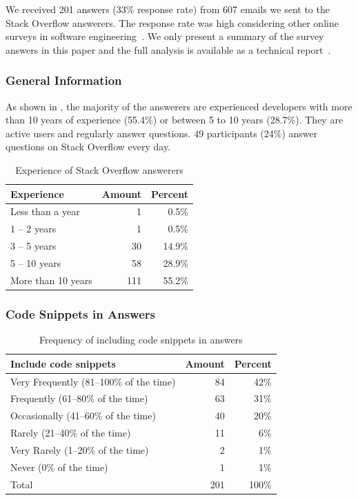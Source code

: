 \documentclass[10pt,journal,compsoc]{IEEEtran}
\begin{document}
We received 201 answers (33\% response rate) from 607 emails we sent to the
Stack Overflow answerers. The response rate was high considering other
online surveys in software engineering~\cite{Punter2003}. 
We only present a summary of the survey answers in
this paper and the full analysis is available as a technical report~\cite{Ragkhitwetsagul_RN2017}.

\subsubsection{General Information}
As shown in , the majority of the answerers are experienced
developers with more than 10 years of experience (55.4\%) or between 5 to 10
years (28.7\%). They are active users and regularly answer questions. 49
participants (24\%) answer questions on Stack Overflow every day.

\begin{table}
	\centering
	\caption{Experience of Stack Overflow answerers}
	\label{tab:survey_exp}
	\begin{tabular}{lrr}
		\toprule
		Experience & Amount & Percent \\
		\midrule
		Less than a year & 1 & 0.5\% \\
		1 -- 2 years & 1 & 0.5\% \\
		3 -- 5 years & 30 & 14.9\% \\
		5 -- 10 years & 58 & 28.9\% \\
		More than 10 years	& 111 & 55.2\% \\
		\bottomrule
	\end{tabular}
\end{table}

\subsubsection{Code Snippets in Answers} 

\begin{table}
	\centering
	\caption{Frequency of including code snippets in answers}
	\label{tab:survey_code_snippet_frequency}
	\begin{tabular}{lrr}
		\toprule
		Include code snippets & Amount & Percent \\
		\midrule
		Very Frequently (81--100\% of the time)	& 84 & 42\% \\
		Frequently (61--80\% of the time) &	63 & 31\% \\
		Occasionally (41--60\% of the time) & 40 & 20\% \\
		Rarely (21--40\% of the time) & 11 & 6\% \\
		Very Rarely (1--20\% of the time) & 2 & 1\% \\
		Never (0\% of the time) & 1 & 1\% \\
		\midrule
		Total & 201 & 100\% \\
		\bottomrule
	\end{tabular}
\end{table}
\end{document}
